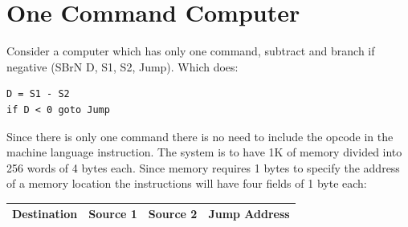 \section{One Command Computer}

Consider a computer which has only one command, subtract and branch if negative (SBrN D, S1, S2, Jump).  Which does:

\begin{verbatim}
D = S1 - S2
if D < 0 goto Jump
\end{verbatim}

Since there is only one command there is no need to include the opcode in the machine language instruction.  The system is to have 1K of memory divided into 256 words of 4 bytes each.  Since memory requires 1 bytes to specify the address of a memory location the instructions will have four fields of 1 byte each:

\begin{tabular}{|c|c|c|c|} \hline
Destination & Source 1 & Source 2 & Jump Address \\ \hline
\end{tabular}

